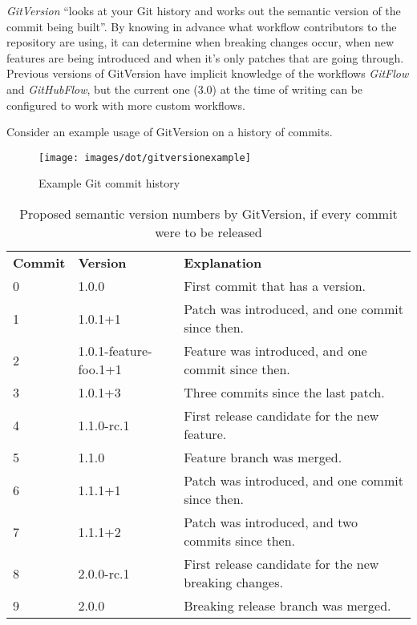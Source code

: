 \documentclass{l4proj}
\begin{document}
\textit{GitVersion}\cite{GitVersion} ``looks at your Git history and
works out the semantic version of the commit being built''.  By
knowing in advance what workflow contributors to the repository are
using, it can determine when breaking changes occur, when new features
are being introduced and when it's only patches that are going
through. Previous versions of GitVersion have implicit knowledge of
the workflows \textit{GitFlow}\cite{GitFlow} and
\textit{GitHubFlow}\cite{GitHubFlow}, but the current one (3.0) at the
time of writing can be configured to work with more custom workflows.

Consider an example usage of GitVersion on a history of commits.

\begin{figure}[H]
\centering
\texttt{[image: images/dot/gitversionexample]}
\caption{Example Git commit history}
\end{figure}

\begin{table}[H]
\centering
\begin{tabular}{|l|l|l|}
\textbf{Commit} & \textbf{Version} & \textbf{Explanation}                              \\
0      & 1.0.0                 & First commit that has a version.                      \\
1      & 1.0.1+1               & Patch was introduced, and one commit since then.      \\
2      & 1.0.1-feature-foo.1+1 & Feature was introduced, and one commit since then.    \\
3      & 1.0.1+3               & Three commits since the last patch.                   \\
4      & 1.1.0-rc.1            & First release candidate for the new feature.          \\
5      & 1.1.0                 & Feature branch was merged.                            \\
6      & 1.1.1+1               & Patch was introduced, and one commit since then.      \\
7      & 1.1.1+2               & Patch was introduced, and two commits since then.     \\
8      & 2.0.0-rc.1            & First release candidate for the new breaking changes. \\
9      & 2.0.0                 & Breaking release branch was merged.
\end{tabular}
\caption{Proposed semantic version numbers by GitVersion, if every
commit were to be released}
\end{table}
\end{document}
